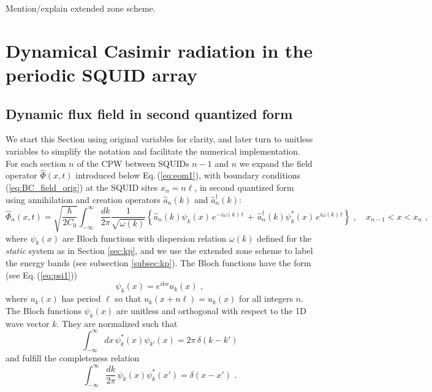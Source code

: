 Mention/explain extended zone scheme.




\section{Dynamical Casimir radiation in the periodic SQUID array}\label{sec:dcr}
%

\color{blue}
\subsection{Dynamic flux field in second quantized form}

\noindent
We start this Section using original variables for clarity, and later turn to unitless variables to 
simplify the notation and facilitate the numerical implementation. 
For each section $n$ of the CPW between SQUIDs $n-1$ and $n$ we expand the field operator $\hat{\Phi}(x,t)$
introduced below Eq.\,(\ref{eq:eom1}), with boundary conditions (\ref{eq:BC_field_orig}) at the SQUID sites 
$x_n = n \ell$, in second quantized form using annihilation and creation operators $\hat{a}_n(k)$ and 
${\hat a}_n^\dagger(k)$:
%
\begin{equation} \label{eq:flux_field_orig}
    \hat{\Phi}_n(x,t) = \sqrt{\frac{\hbar}{2 C_0}} 
    \int_{-\infty}^{\infty}\frac{dk}{2 \pi} \frac{1}{\sqrt{\omega(k)}}
    \left\{ \hat{a}_n(k) \psi_k(x) \, e^{-i \omega(k) \, t} \, + \, 
    \hat{a}_n^{\dagger}(k) \psi_k^*(x) \, e^{i \omega(k) \, t} \right\} \, \, , \quad x_{n-1} < x < x_n \, \, ,
\end{equation}
%
where $\psi_k(x)$ are Bloch functions with dispersion relation $\omega(k)$ defined for the {\em static}
system as in Section \ref{sec:kp}, and we use the extended zone scheme to label the energy bands 
(see subsection \ref{subsec:kp}). The Bloch functions have the form (see Eq.\,(\ref{eq:psi1})) 
%
\begin{equation} \label{eq:psi2}
\psi_k(x) = e^{i k x} u_k(x) \, \, ,   
\end{equation}
%
where $u_k(x)$ has period $\ell$ so that $u_k(x + n \ell) = u_k(x)$
for all integers $n$.
The Bloch functions $\psi_k(x)$ are unitless and orthogonal with respect to 
the 1D wave vector $k$. They are normalized such that
%
\begin{equation} \label{eq:psi1_norm_orig2}
\int_{-\infty}^{\infty} dx \, \psi^*_k(x) \psi_{k'}(x) = 2 \pi \, \delta(k - k')
\end{equation}
%
and fulfill the completeness relation
%
\begin{equation} \label{eq:psi1_comp_orig}
\int_{-\infty}^{\infty}\frac{dk}{2 \pi} \, \psi_{k}(x) \psi^*_k(x') = \delta(x-x') \, \, .
\end{equation}

